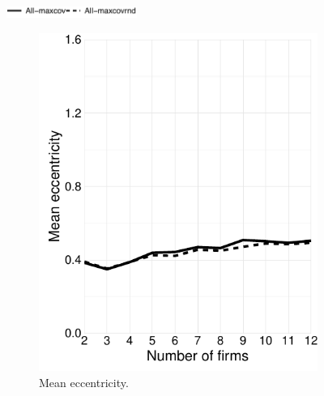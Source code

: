 \documentclass[preprint, 12pt]{elsarticle}
\begin{document}
\begin{figure}[h!]
	\centering
	\caption{Estimates from market with symmetric and unimodal distribution of consumers ($\mu = 0$ and $n_l/n_r = 1$). Solid lines is \emph{maxcov} model and the dashed line is the \emph{maxcovrnd} model.}
	\includegraphics[width=42.5mm]{Graphics/legend_maxcovrnd.pdf}

	\begin{subfigure}[t]{0.315\textwidth}
		\centering
		\includegraphics[width=\textwidth, trim={4mm 0 0 0}]{Graphics/figA11.pdf}
		\caption{Mean eccentricity.}
		\label{fig:eccentricity_maxcovrnd}
	\end{subfigure}
	~
	\begin{subfigure}[t]{0.315\textwidth}
		\centering

\end{subfigure}
\end{figure}
\end{document}
